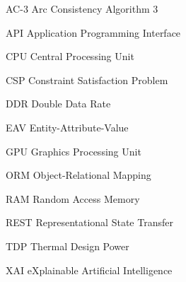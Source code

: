 \begin{siglas}
	\item[AC-3] Arc Consistency Algorithm 3
	\item[API] Application Programming Interface
	\item[CPU] Central Processing Unit
	\item[CSP] Constraint Satisfaction Problem
	\item[DDR] Double Data Rate
	\item[EAV] Entity-Attribute-Value
	\item[GPU] Graphics Processing Unit
	\item[ORM] Object-Relational Mapping
	\item[RAM] Random Access Memory
	\item[REST] Representational State Transfer
	\item[TDP] Thermal Design Power
	\item[XAI] eXplainable Artificial Intelligence
\end{siglas}